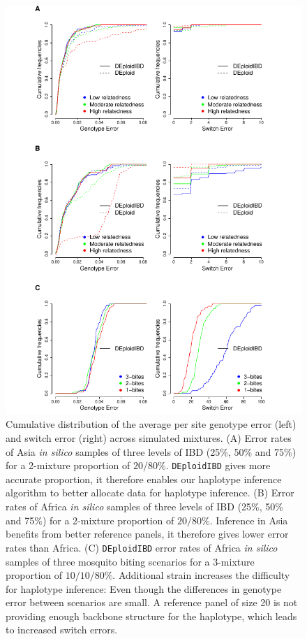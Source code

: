 \documentclass[9pt,lineno]{elife}
\begin{document}
\begin{figure}[htp]
  \begin{center}
    \includegraphics[width=\textwidth]{Fig3.pdf}
    \caption{Cumulative distribution of the average per site genotype error (left) and switch error (right) across simulated mixtures.
    (A) Error rates of Asia {\it in silico} samples of three levels of IBD (25\%, 50\% and 75\%) for a 2-mixture proportion of $20/80\%$. {\tt DEploidIBD} gives more accurate proportion, it therefore enables our haplotype inference algorithm to better allocate data for haplotype inference.
    (B) Error rates of Africa {\it in silico} samples of three levels of IBD (25\%, 50\% and 75\%) for a 2-mixture proportion of $20/80\%$. Inference in Asia benefits from better reference panels, it therefore gives lower error rates than Africa.
    (C) {\tt DEploidIBD} error rates of Africa {\it in silico} samples of three mosquito biting scenarios for a 3-mixture proportion of $10/10/80\%$. Additional strain increases the difficulty for haplotype inference: Even though the differences in genotype error between scenarios are small. A reference panel of size 20 is not providing enough backbone structure for the haplotype, which leads to increased switch errors.
    } \label{fig:error-analysis}
  \end{center}
\end{figure}
\end{document}
